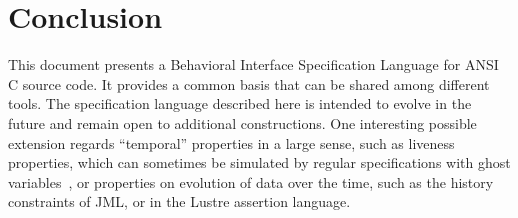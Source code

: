 
\chapter{Conclusion}

This document presents a Behavioral Interface Specification Language
for ANSI C source code. It provides a common basis that can be
shared among different tools.
The specification language described here is intended to evolve in the
future and remain open to additional constructions.
One interesting possible extension regards ``temporal''
properties in a large sense, such as liveness properties, which can
sometimes be simulated by regular specifications with ghost
variables~\cite{giorgetti06fase}, or properties on evolution of data
over the time, such as the history constraints of JML, or in the Lustre
assertion language.


